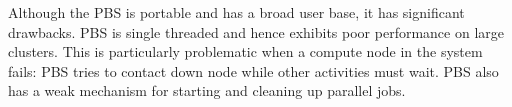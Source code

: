 Although the PBS is portable and has a broad user base, it has significant drawbacks.
PBS is single threaded and hence exhibits poor performance on large clusters. 
This is particularly problematic when a compute node in the system fails: 
PBS tries to contact down node while other activities must wait. 
PBS also has a weak mechanism for starting and cleaning up parallel jobs. 
